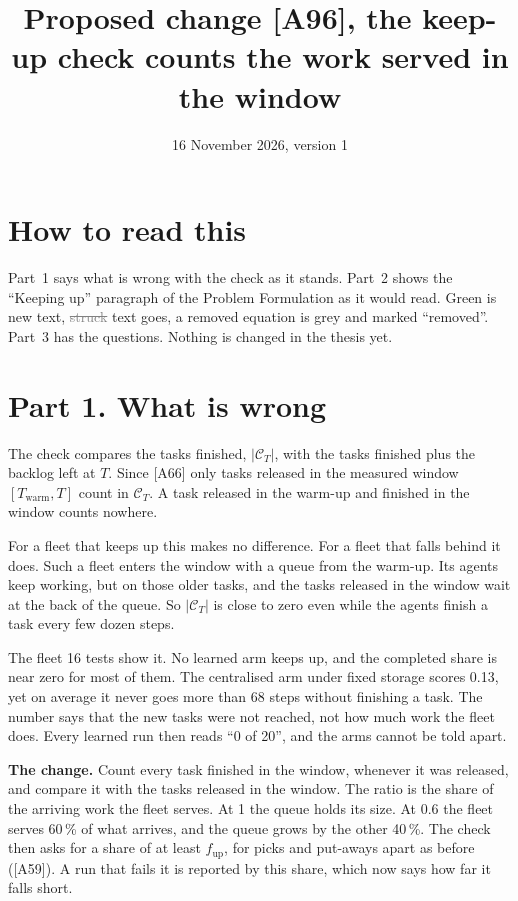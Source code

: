 \documentclass[11pt,a4paper]{article}
\title{Proposed change [A96], the keep-up check counts the work served in the window}
\date{16 November 2026, version 1}
\newcommand{\new}[1]{\textcolor{newc}{#1}}
\newcommand{\old}[1]{\textcolor{gray}{\sout{#1}}}
\begin{document}
\maketitle

\section*{How to read this}
Part~1 says what is wrong with the check as it stands. Part~2 shows the ``Keeping up'' paragraph of
the Problem Formulation as it would read. \new{Green} is new text, \old{struck} text goes, a removed
equation is grey and marked ``removed''. Part~3 has the questions. Nothing is changed in the thesis yet.

\section*{Part 1. What is wrong}

The check compares the tasks finished, $|\mathcal{C}_T|$, with the tasks finished plus the backlog
left at $T$. Since [A66] only tasks released in the measured window $[T_{\mathrm{warm}}, T]$ count in
$\mathcal{C}_T$. A task released in the warm-up and finished in the window counts nowhere.

For a fleet that keeps up this makes no difference. For a fleet that falls behind it does. Such a
fleet enters the window with a queue from the warm-up. Its agents keep working, but on those older
tasks, and the tasks released in the window wait at the back of the queue. So $|\mathcal{C}_T|$ is
close to zero even while the agents finish a task every few dozen steps.

The fleet 16 tests show it. No learned arm keeps up, and the completed share is near zero for most of
them. The centralised arm under fixed storage scores 0.13, yet on average it never goes more than 68
steps without finishing a task. The number says that the new tasks were not reached, not how much work
the fleet does. Every learned run then reads ``0 of 20'', and the arms cannot be told apart.

\textbf{The change.} Count every task finished in the window, whenever it was released, and compare
it with the tasks released in the window. The ratio is the share of the arriving work the fleet
serves. At 1 the queue holds its size. At 0.6 the fleet serves 60\,\% of what arrives, and the queue
grows by the other 40\,\%. The check then asks for a share of at least $f_{\mathrm{up}}$, for picks
and put-aways apart as before ([A59]). A run that fails it is reported by this share, which now
says how far it falls short.
\end{document}
